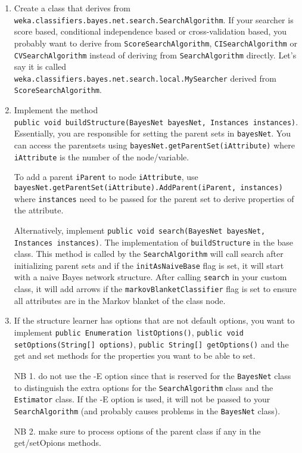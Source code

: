 \documentclass[a4paper]{article}
\begin{document}
\begin{enumerate}
\item Create a class that derives from {\tt weka.classifiers.bayes.net.search.SearchAlgorithm}.
  If your searcher is score based, conditional independence based or cross-validation based, you
  probably want to derive from {\tt ScoreSearchAlgorithm}, {\tt CISearchAlgorithm} or {\tt CVSearchAlgorithm}
  instead of deriving from {\tt SearchAlgorithm} directly.
  Let's say it is called \\{\tt weka.classifiers.bayes.net.search.local.MySearcher}
  derived from {\tt ScoreSearchAlgorithm}.

\item Implement the method\\
{\tt public void buildStructure(BayesNet bayesNet, Instances instances)}.
Essentially, you are responsible for setting the parent sets in {\tt bayesNet}.
You can access the parentsets using {\tt bayesNet.getParentSet(iAttribute)} where
{\tt iAttribute} is the number of the node/variable.

To add a parent {\tt iParent} to node {\tt iAttribute}, use\\ 
{\tt bayesNet.getParentSet(iAttribute).AddParent(iParent, instances)} where
{\tt instances} need to be passed for the parent set to derive properties of
the attribute.

Alternatively, implement
{\tt public void search(BayesNet bayesNet, Instances instances)}.
The implementation of {\tt buildStructure} in the base class.
This method is called by the {\tt SearchAlgorithm} will call search
after initializing parent sets and if the {\tt initAsNaiveBase} flag is set, it will
start with a naive Bayes network structure. After calling {\tt search} in your
custom class, it will add arrows if the {\tt markovBlanketClassifier} flag is 
set to ensure all attributes are in the Markov blanket of the class node.

\item If the structure learner has options that are not default options,
you want to implement {\tt public Enumeration listOptions()}, 
{\tt public void setOptions(String[] options)}, 
{\tt public String[] getOptions()} and the get and set methods for
the properties you want to be able to set.

NB 1. do not use the -E option since that is reserved for the {\tt BayesNet} class to 
distinguish the extra options for the {\tt SearchAlgorithm} class and the {\tt Estimator} class.
If the -E option is used, it will not be passed to your {\tt SearchAlgorithm} (and
probably causes problems in the {\tt BayesNet} class).

NB 2. make sure to process options of the parent class if any in the get/setOpions
methods.
\end{enumerate}
\end{document}
